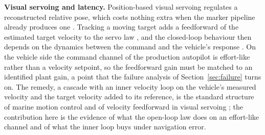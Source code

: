 \textbf{Visual servoing and latency.} Position-based visual servoing regulates a reconstructed relative pose, which costs nothing extra when the marker pipeline already produces one \cite{chaumette2006visual,garrido2014automatic}. Tracking a moving target adds a feedforward of the estimated target velocity to the servo law \cite{chaumette2007visual}, and the closed-loop behaviour then depends on the dynamics between the command and the vehicle's response \cite{corke1996dynamic}. On the vehicle side the command channel of the production autopilot is effort-like rather than a velocity setpoint, so the feedforward gain must be matched to an identified plant gain, a point that the failure analysis of Section~\ref{sec:failure} turns on. The remedy, a cascade with an inner velocity loop on the vehicle's measured velocity and the target velocity added to its reference, is the standard structure of marine motion control \cite{fossen2011handbook} and of velocity feedforward in visual servoing \cite{corke1996dynamic}; the contribution here is the evidence of what the open-loop law does on an effort-like channel and of what the inner loop buys under navigation error.
